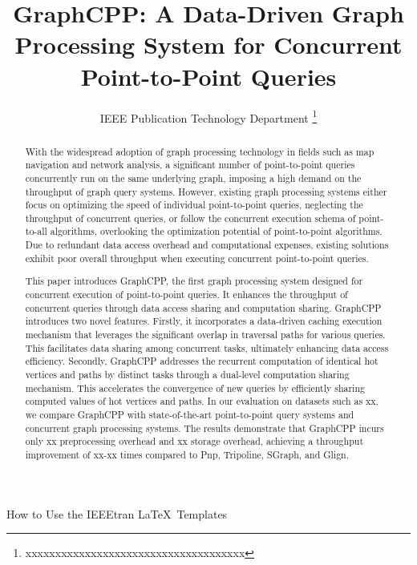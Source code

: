 \documentclass[lettersize,journal]{IEEEtran} %
\begin{document}
\title{GraphCPP: A Data-Driven Graph Processing System for Concurrent Point-to-Point Queries} %
\author{IEEE Publication Technology Department %
\thanks{xxxxxxxxxxxxxxxxxxxxxxxxxxxxxxxxxxxxx}} %

{How to Use the IEEEtran \LaTeX \ Templates} 

\maketitle %

\graphicspath{{./picture/}}


\begin{abstract} %
With the widespread adoption of graph processing technology in fields such as map navigation and network analysis, a significant number of point-to-point queries concurrently run on the same underlying graph, imposing a high demand on the throughput of graph query systems. However, existing graph processing systems either focus on optimizing the speed of individual point-to-point queries, neglecting the throughput of concurrent queries, or follow the concurrent execution schema of point-to-all algorithms, overlooking the optimization potential of point-to-point algorithms. Due to redundant data access overhead and computational expenses, existing solutions exhibit poor overall throughput when executing concurrent point-to-point queries.

This paper introduces GraphCPP, the first graph processing system designed for concurrent execution of point-to-point queries. It enhances the throughput of concurrent queries through data access sharing and computation sharing. GraphCPP introduces two novel features. Firstly, it incorporates a data-driven caching execution mechanism that leverages the significant overlap in traversal paths for various queries. This facilitates data sharing among concurrent tasks, ultimately enhancing data access efficiency. Secondly, GraphCPP addresses the recurrent computation of identical hot vertices and paths by distinct tasks through a dual-level computation sharing mechanism. This accelerates the convergence of new queries by efficiently sharing computed values of hot vertices and paths. In our evaluation on datasets such as xx, we compare GraphCPP with state-of-the-art point-to-point query systems and concurrent graph processing systems. The results demonstrate that GraphCPP incurs only xx preprocessing overhead and xx storage overhead, achieving a throughput improvement of xx-xx times compared to Pnp, Tripoline, SGraph, and Glign.
  
\end{abstract}
\end{document}
